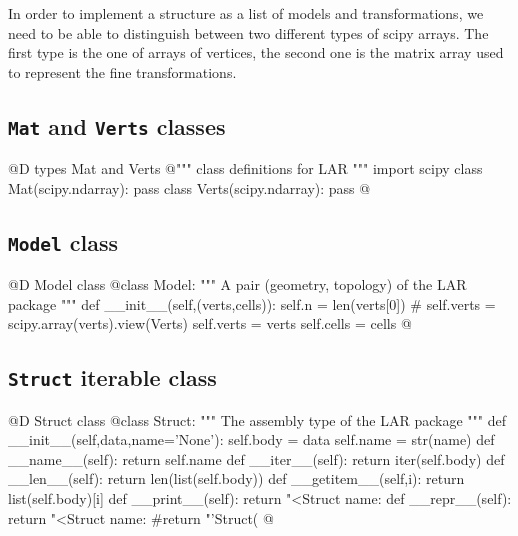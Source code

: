 \documentclass[11pt,oneside]{article}    %
\begin{document}
In order to implement a structure as a list of models and transformations, we need to be able to distinguish between two different types of scipy arrays. The first type is the one of arrays of vertices, the second one is the matrix array used to represent the fine transformations.

\subsection{\texttt{Mat} and \texttt{Verts} classes}
@D types Mat and Verts
@{""" class definitions for LAR """
import scipy
class Mat(scipy.ndarray): pass
class Verts(scipy.ndarray): pass
@}

\subsection{\texttt{Model} class}
@D Model class
@{class Model:
    """ A pair (geometry, topology) of the LAR package """
    def __init__(self,(verts,cells)):
        self.n = len(verts[0])
        # self.verts = scipy.array(verts).view(Verts)
        self.verts = verts
        self.cells = cells
@}

\subsection{\texttt{Struct} iterable class}
@D Struct class
@{class Struct:
    """ The assembly type of the LAR package """
    def __init__(self,data,name='None'):
        self.body = data
        self.name = str(name)
    def __name__(self):
        return self.name
    def __iter__(self):
        return iter(self.body)
    def __len__(self):
        return len(list(self.body))
    def __getitem__(self,i):
        return list(self.body)[i]
    def __print__(self): 
        return "<Struct name: %
    def __repr__(self):
        return "<Struct name: %
        #return "'Struct(%
@}
\end{document}
